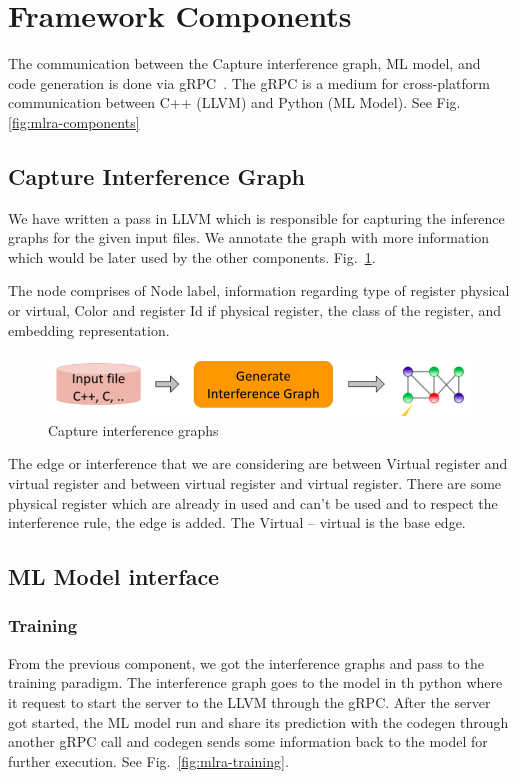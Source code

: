 \section{Framework Components}\label{sec:mlra:components}
The communication between the Capture interference graph, ML model, and code generation is done via gRPC~\cite{grpc}. The gRPC is a medium for cross-platform communication between C++ (LLVM) and Python (ML Model). See Fig.\ref{fig:mlra-components}
\subsection{Capture Interference Graph}
We have written a pass in LLVM which is responsible for capturing the inference graphs for the given input files. We annotate the graph with more information which would be later used by the other components. Fig.~\ref{fig:mlra-cig}.

The node comprises of Node label, information regarding type of register physical or virtual, Color and register Id if physical register, the class of the register, and embedding representation.

\begin{figure}[t]
    \centering
    \includegraphics[scale=0.4]{figures/chapter-5/mlra_cig.png}
    \caption{Capture interference graphs}
     \label{fig:mlra-cig}
\end{figure}

The edge or interference that we are considering are between Virtual register and virtual register and between virtual register and virtual register. There are some physical register which are already in used and can’t be used and to respect the interference rule, the edge is added. The Virtual -- virtual is the base edge.
\subsection{ML Model interface}

\subsubsection{Training}
From the previous component, we got the interference graphs and pass to the training paradigm. The interference graph goes to the model in th python where it request to start the server to the LLVM through the gRPC. After the server got started, the ML model run and share its prediction with the codegen through another gRPC call and codegen sends some information back to the model for further execution. See Fig.~\ref{fig:mlra-training}.

